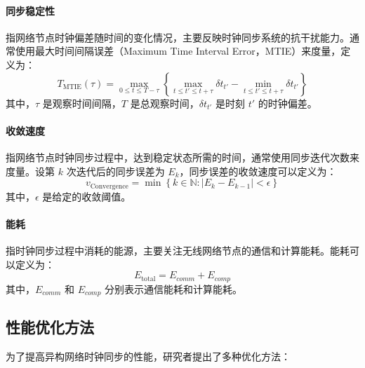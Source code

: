 \documentclass[UTF8,a4paper,12pt]{ctexart}
\numberwithin{equation}{section}
\begin{document}
	\paragraph{同步稳定性}指网络节点时钟偏差随时间的变化情况，主要反映时钟同步系统的抗干扰能力。通常使用最大时间间隔误差（Maximum Time Interval Error，MTIE）来度量，定义为：
	\begin{equation}
		T_\text{MTIE}(\tau) = \max_{0 \leq t \leq T - \tau} \left\{ \max_{t \leq t' \leq t + \tau} \delta t_{t'} - \min_{t \leq t' \leq t + \tau} \delta t_{t'} \right\}
	\end{equation}
	其中，$\tau$ 是观察时间间隔，$T$ 是总观察时间，$\delta t_{t'}$ 是时刻 $t'$ 的时钟偏差。
	\paragraph{收敛速度}指网络节点时钟同步过程中，达到稳定状态所需的时间，通常使用同步迭代次数来度量。设第 $k$ 次迭代后的同步误差为 $E_k$，同步误差的收敛速度可以定义为：
	\begin{equation}
		v_\text{Convergence} = \min \left\{ k \in \mathbb{N} : |E_k - E_{k-1}| < \epsilon \right\}
	\end{equation}
	其中，$\epsilon$ 是给定的收敛阈值。
	\paragraph{能耗}指时钟同步过程中消耗的能源，主要关注无线网络节点的通信和计算能耗。能耗可以定义为：
	\begin{equation}
		E_\text{total}= E_{comm} + E_{comp}
	\end{equation}
	其中，$E_{comm}$ 和 $E_{comp}$ 分别表示通信能耗和计算能耗。
	\subsection{性能优化方法}
	
	为了提高异构网络时钟同步的性能，研究者提出了多种优化方法：
	
\end{document}
